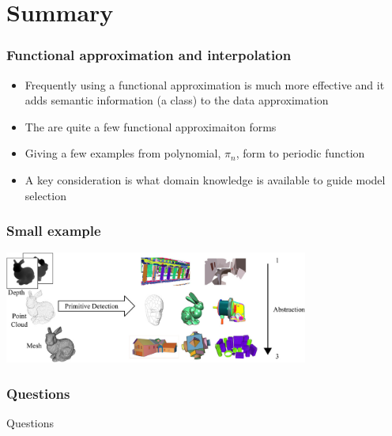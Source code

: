 \documentclass[10pt]{beamer}
\begin{document}
\section{Summary}

\begin{frame}
  \frametitle{Functional approximation and interpolation}
  \begin{itemize}
  \item Frequently using a functional approximation is much more
    effective and it adds semantic information (a class) to the data
    approximation
  \item The are quite a few functional approximaiton forms
  \item Giving a few examples from polynomial, $\pi_n$, form to periodic function
  \item A key consideration is what domain knowledge is available to guide model selection
  \end{itemize}
\end{frame}

\begin{frame}
  \frametitle{Small example}
  \centerline{\includegraphics[width=10cm]{primitives}}
\end{frame}

\begin{frame}
  \frametitle{Questions}
  \centerline{\Huge Questions}
\end{frame}
\end{document}
